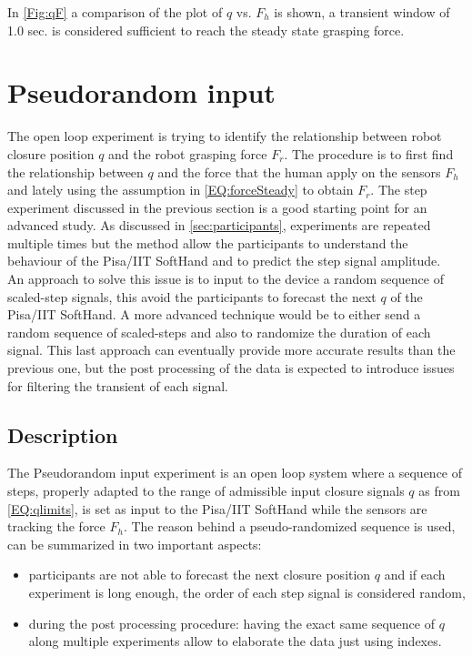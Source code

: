 In \ref{Fig:qF} a comparison of the plot of $q$ vs. $F_{h}$ is shown, a transient window of 1.0 sec. is considered sufficient to reach the steady state grasping force. 


\section{Pseudorandom input}\label{sec:pseudo}
The open loop experiment is trying to identify the relationship between robot closure position $q$ and the robot grasping force $F_{r}$. The procedure is to first find the relationship between $q$ and the force that the human apply on the sensors $F_{h}$ and lately using the assumption in \ref{EQ:forceSteady} to obtain $F_{r}$. 
The step experiment discussed in the previous section is a good starting point for an advanced study. 
As discussed in \ref{sec:participants}, experiments are repeated multiple times but the method allow the participants to understand the behaviour of the Pisa/IIT SoftHand and to predict the step signal amplitude. \\
An approach to solve this issue is to input to the device a random sequence of scaled-step signals, this avoid the participants to forecast the next $q$ of the Pisa/IIT SoftHand. A more advanced technique would be to either send a random sequence of scaled-steps and also to randomize the duration of each signal. This last approach can eventually provide more accurate results than the previous one, but the post processing of the data is expected to introduce issues for filtering the transient of each signal.
\subsection{Description}
The Pseudorandom input experiment is an open loop system where a sequence of steps, properly adapted to the range of admissible input closure signals $q$ as from \ref{EQ:qlimits}, is set as input to the Pisa/IIT SoftHand while the sensors are tracking the force $F_{h}$.
The reason behind a pseudo-randomized sequence is used, can be summarized in two important aspects:
\begin{itemize}
\item participants are not able to forecast the next closure position $q$ and if each experiment is long enough, the order of each step signal is considered random,
\item during the post processing procedure: having the exact same sequence of $q$ along multiple experiments allow to elaborate the data just using indexes.
\end{itemize}

